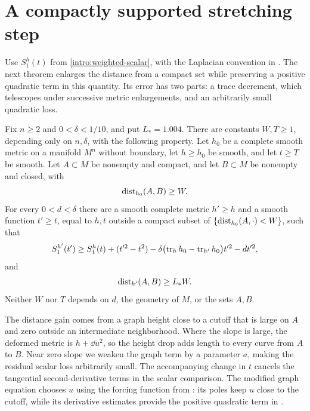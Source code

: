 \section{A compactly supported stretching step}
\label{step:section}

Use $S^{h}_1(t)$ from \eqref{intro:weighted-scalar}, with the
Laplacian convention in .
The next theorem enlarges the distance from a compact set while preserving
a positive quadratic term in this quantity.  Its error has two parts: a trace
decrement, which telescopes under successive metric enlargements, and an
arbitrarily small quadratic loss.

\begin{theorem}\label{step:main}
Fix $n\ge2$ and $0<\delta<1/10$, and put $L_*=1.004$.  There are
constants $W,T\ge1$, depending only on $n,\delta$, with the following
property.  Let $h_0$ be a complete smooth metric on a manifold $M^n$
without boundary, let $h\ge h_0$ be smooth, and let $t\ge T$ be smooth.
Let $A\subset M$ be nonempty and compact, and let $B\subset M$ be
nonempty and closed, with
\[
 \operatorname{dist}_{h_0}(A,B)\ge W.
\]
For every $0<d<\delta$ there are a smooth complete metric $h'\ge h$
and a smooth function $t'\ge t$, equal to $h,t$ outside a compact
subset of $\{\operatorname{dist}_{h_0}(A,\cdot)<W\}$, such that
\begin{equation}\label{step:conclusion}
 S^{h'}_1(t')\ge S^{h}_1(t)+(t'^2-t^2)
 -\delta\bigl(\operatorname{tr}_h h_0-\operatorname{tr}_{h'}h_0\bigr)t'^2-dt'^2,
\end{equation}
and
\begin{equation}\label{step:distance}
 \operatorname{dist}_{h'}(A,B)\ge L_*W.
\end{equation}
Neither $W$ nor $T$ depends on $d$,
the geometry of $M$, or the sets $A,B$.
\end{theorem}

The distance gain comes from a graph height close to a cutoff that is
large on $A$ and zero outside an intermediate neighborhood. Where the
slope is large, the deformed metric is $h+\dd u^2$, so the height drop
adds length to every curve from $A$ to $B$. Near zero slope we weaken
the graph term by a parameter $a$, making the residual scalar loss
arbitrarily small. The accompanying change in $t$ cancels the tangential
second-derivative terms in the scalar comparison. The modified graph
equation chooses $u$ using the forcing function from :
its poles keep $u$ close to the cutoff, while its derivative estimates
provide the positive quadratic term in .

